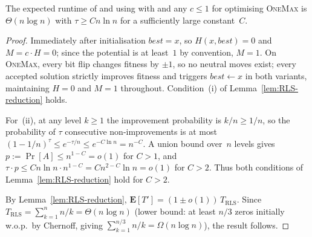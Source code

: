 \begin{theorem}\label{thm:onemaxexpo}
The expected runtime of \firstBest{} and \lastBest{} using \IPHfcm{} with
\linHD{} and any $c\leq 1$ for optimising \textsc{OneMax} is $\Theta(n\log n)$
with $\tau\geq Cn\ln n$ for a sufficiently large constant~$C$.
\end{theorem}
\begin{proof}
Immediately after initialisation $\mathit{best}=x$, so $H(x,\mathit{best})=0$
and $M=c\cdot H=0$; since the potential is at least~$1$ by convention, $M=1$.
On \textsc{OneMax}, every bit flip changes fitness by $\pm 1$, so no neutral
moves exist; every accepted solution strictly improves fitness and triggers
$\mathit{best}\leftarrow x$ in both variants, maintaining $H=0$ and $M=1$
throughout.  Condition~(i) of Lemma~\ref{lem:RLS-reduction} holds.

For~(ii), at any level $k\geq 1$ the improvement probability is $k/n\geq 1/n$,
so the probability of $\tau$ consecutive non-improvements is at most
$(1-1/n)^\tau\leq e^{-\tau/n}\leq e^{-C\ln n}=n^{-C}$.
A union bound over~$n$ levels gives $p:=\Pr[A]\leq n^{1-C}=o(1)$ for $C>1$,
and $\tau\cdot p\leq Cn\ln n\cdot n^{1-C}=Cn^{2-C}\ln n=o(1)$ for $C>2$.
Thus both conditions of Lemma~\ref{lem:RLS-reduction} hold for $C>2$.

By Lemma~\ref{lem:RLS-reduction},
$\mathbf{E}[T']=(1\pm o(1))\,T_{\mathrm{RLS}}$.
Since $T_{\mathrm{RLS}}=\sum_{k=1}^{n}n/k=\Theta(n\log n)$ (lower bound: at
least $n/3$ zeros initially w.o.p.\ by Chernoff, giving
$\sum_{k=1}^{n/3}n/k=\Omega(n\log n)$), the result follows.
\end{proof}




